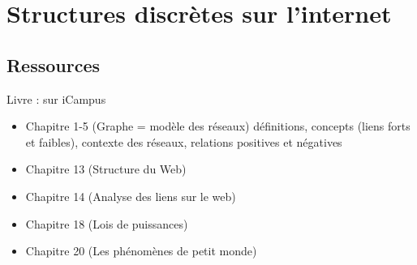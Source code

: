\chapter{Structures discrètes sur l'internet}

\section{Ressources}
Livre : sur iCampus 
\begin{itemize}
\item Chapitre 1-5 (Graphe = modèle des réseaux) définitions, concepts (liens forts et faibles), contexte des réseaux, relations positives et négatives
\item Chapitre 13 (Structure du Web)
\item Chapitre 14 (Analyse des liens sur le web)
\item Chapitre 18 (Lois de puissances)
\item Chapitre 20 (Les phénomènes de petit monde)
\end{itemize}
